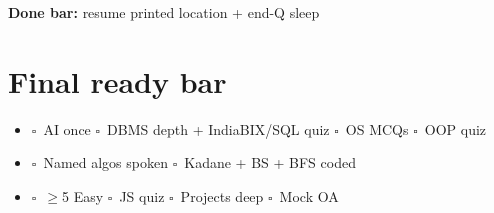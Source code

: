 \documentclass[a4paper,9pt]{extarticle}
\newcommand{\tick}{$\square$\ }
\begin{document}
\noindent\textbf{Done bar:} resume printed \textbar{} location + end-Q \textbar{} sleep

\section{Final ready bar}
\begin{itemize}
  \item \tick AI once \quad \tick DBMS depth + IndiaBIX/SQL quiz \quad \tick OS MCQs \quad \tick OOP quiz
  \item \tick Named algos spoken \quad \tick Kadane + BS + BFS coded
  \item \tick $\geq$5 Easy \quad \tick JS quiz \quad \tick Projects deep \quad \tick Mock OA
\end{itemize}

\vspace{0.6mm}
\end{document}
